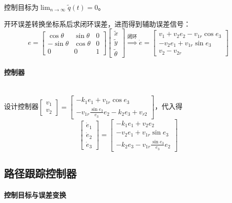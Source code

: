 \documentclass[
12pt, %
a4paper, 
oneside, %
headinclude,footinclude, %
]{scrartcl}
\begin{document}
控制目标为$ \lim_{n \to \infty} \tilde{q}(t) = 0 $。

开环误差转换坐标系后求闭环误差，进而得到辅助误差信号：
$$ 
e = \begin{bmatrix} \cos\theta & \sin\theta & 0 \\ -\sin\theta & \cos\theta & 0 \\ 0 & 0 & 1 \end{bmatrix} \begin{bmatrix} \tilde{x} \\ \tilde{y} \\ \tilde{\theta} \end{bmatrix}
\overset{\text{闭环}}{\Longrightarrow}
\dot{e} = \begin{bmatrix} v_1 + v_2 e_2 - v_{1r} \cos e_3 \\ - v_2 e_1 + v_{1r} \sin e_3 \\ v_2 - v_{2r} \end{bmatrix} 
$$
\paragraph{控制器}~\\

设计控制器$ \begin{bmatrix} v_1 \\ v_2 \end{bmatrix} = \begin{bmatrix} -k_1 e_1 + v_{1r} \cos e_3 \\ -v_{1r} \frac{\sin e_3}{e_3} e_2 - k_2 e_3 + v_{r2} \end{bmatrix} $，代入得
$$ \begin{bmatrix} \dot{e}_1 \\ \dot{e}_2 \\ \dot{e}_3 \end{bmatrix} = \begin{bmatrix} -k_1 e_1 + v_2 e_2 \\ -v_2 e_1 + v_{1r} \sin e_3 \\ -k_2 e_3 - v_{1r} \frac{\sin e_3}{e_3} e_2 \end{bmatrix} $$
\subsection[路径跟踪控制器]{路径跟踪控制器}
\paragraph{控制目标与误差变换}~\\
\end{document}
